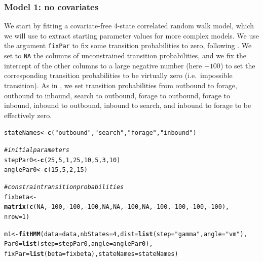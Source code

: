 \documentclass[12pt]{article}\usepackage[]{graphicx}\usepackage[]{xcolor}
\makeatletter
\newcommand{\hlnum}[1]{\textcolor[rgb]{0.686,0.059,0.569}{#1}}%
\newcommand{\hlsng}[1]{\textcolor[rgb]{0.192,0.494,0.8}{#1}}%
\newcommand{\hlcom}[1]{\textcolor[rgb]{0.678,0.584,0.686}{\textit{#1}}}%
\newcommand{\hlopt}[1]{\textcolor[rgb]{0,0,0}{#1}}%
\newcommand{\hldef}[1]{\textcolor[rgb]{0.345,0.345,0.345}{#1}}%
\newcommand{\hlkwb}[1]{\textcolor[rgb]{0.69,0.353,0.396}{#1}}%
\newcommand{\hlkwc}[1]{\textcolor[rgb]{0.333,0.667,0.333}{#1}}%
\newcommand{\hlkwd}[1]{\textcolor[rgb]{0.737,0.353,0.396}{\textbf{#1}}}%
\newenvironment{kframe}{%
 \def\at@end@of@kframe{}%
 \ifinner\ifhmode%
  \def\at@end@of@kframe{\end{minipage}}%
  \begin{minipage}{\columnwidth}%
 \fi\fi%
 \def\FrameCommand##1{\hskip\@totalleftmargin \hskip-\fboxsep
 \colorbox{shadecolor}{##1}\hskip-\fboxsep
     \hskip-\linewidth \hskip-\@totalleftmargin \hskip\columnwidth}%
 \MakeFramed {\advance\hsize-\width
   \@totalleftmargin\z@ \linewidth\hsize
   \@setminipage}}%
 {\par\unskip\endMakeFramed%
 \at@end@of@kframe}
\newenvironment{knitrout}{}{} %
\makeatother
\begin{document}
\subsubsection{Model 1: no covariates}
We start by fitting a covariate-free 4-state correlated random walk model, which we will use to extract starting parameter values for more complex models. We use the argument \verb|fixPar| to fix some transition probabilities to zero, following \cite{MichelotEtAl2017}.  We set to \verb|NA| the columns of unconstrained transition probabilities, and we fix the intercept of the other columns to a large negative number (here $-100$) to set the corresponding transition probabilities to be virtually zero (i.e.\ impossible transition).  As in \cite{MichelotEtAl2017}, we set transition probabilities from outbound to forage, outbound to inbound, search to outbound, forage to outbound, forage to inbound, inbound to outbound, inbound to search, and inbound to forage to be effectively zero.
\begin{knitrout}
\color{fgcolor}\begin{kframe}
\begin{alltt}
\hldef{stateNames} \hlkwb{<-} \hlkwd{c}\hldef{(}\hlsng{"outbound"}\hldef{,}\hlsng{"search"}\hldef{,}\hlsng{"forage"}\hldef{,}\hlsng{"inbound"}\hldef{)}

\hlcom{# initial parameters}
\hldef{stepPar0} \hlkwb{<-} \hlkwd{c}\hldef{(}\hlnum{25}\hldef{,}\hlnum{5}\hldef{,}\hlnum{1}\hldef{,}\hlnum{25}\hldef{,}\hlnum{10}\hldef{,}\hlnum{5}\hldef{,}\hlnum{3}\hldef{,}\hlnum{10}\hldef{)}
\hldef{anglePar0} \hlkwb{<-} \hlkwd{c}\hldef{(}\hlnum{15}\hldef{,}\hlnum{5}\hldef{,}\hlnum{2}\hldef{,}\hlnum{15}\hldef{)}

\hlcom{# constrain transition probabilities}
\hldef{fixbeta} \hlkwb{<-} \hlkwd{matrix}\hldef{(}\hlkwd{c}\hldef{(}\hlnum{NA}\hldef{,}\hlopt{-}\hlnum{100}\hldef{,}\hlopt{-}\hlnum{100}\hldef{,}\hlopt{-}\hlnum{100}\hldef{,}\hlnum{NA}\hldef{,}\hlnum{NA}\hldef{,}\hlopt{-}\hlnum{100}\hldef{,}\hlnum{NA}\hldef{,}\hlopt{-}\hlnum{100}\hldef{,}\hlopt{-}\hlnum{100}\hldef{,}\hlopt{-}\hlnum{100}\hldef{,}\hlopt{-}\hlnum{100}\hldef{),}
                  \hlkwc{nrow}\hldef{=}\hlnum{1}\hldef{)}

\hldef{m1} \hlkwb{<-} \hlkwd{fitHMM}\hldef{(}\hlkwc{data}\hldef{=data,} \hlkwc{nbStates}\hldef{=}\hlnum{4}\hldef{,} \hlkwc{dist}\hldef{=}\hlkwd{list}\hldef{(}\hlkwc{step}\hldef{=}\hlsng{"gamma"}\hldef{,}\hlkwc{angle}\hldef{=}\hlsng{"vm"}\hldef{),}
             \hlkwc{Par0}\hldef{=}\hlkwd{list}\hldef{(}\hlkwc{step}\hldef{=stepPar0,} \hlkwc{angle}\hldef{=anglePar0),}
             \hlkwc{fixPar}\hldef{=}\hlkwd{list}\hldef{(}\hlkwc{beta}\hldef{=fixbeta),} \hlkwc{stateNames} \hldef{= stateNames)}
\end{alltt}
\end{kframe}
\end{knitrout}
\end{document}
